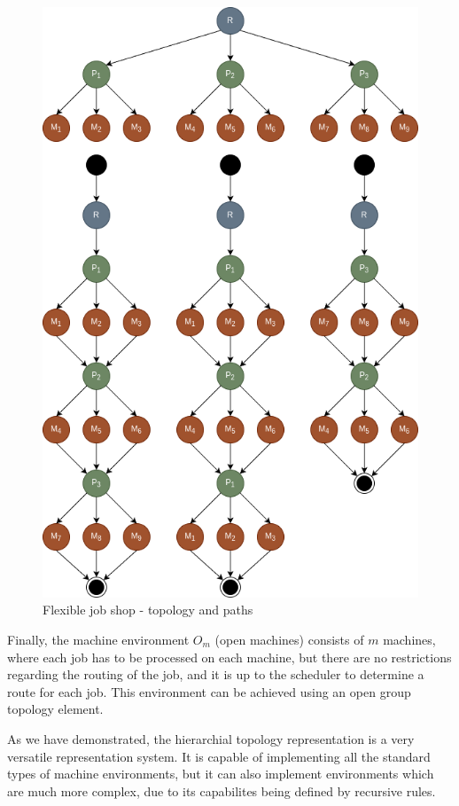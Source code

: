 \begin{figure}[!htbp]
	\centering
	\includegraphics[scale=0.6]{../images/flexible_job_shop.png}
	\caption{Flexible job shop - topology and paths}
    \label{fig:flexible_job_shop}
\end{figure}

Finally, the machine environment $O_m$ (open machines) consists of $m$ machines, where each job has to be processed on each machine, but there are no restrictions regarding the routing of the job, and it is up to the scheduler to determine a route for each job. This environment can be achieved using an open group topology element.

As we have demonstrated, the hierarchial topology representation is a very versatile representation system. It is capable of implementing all the standard types of machine environments, but it can also implement environments which are much more complex, due to its capabilites being defined by recursive rules.